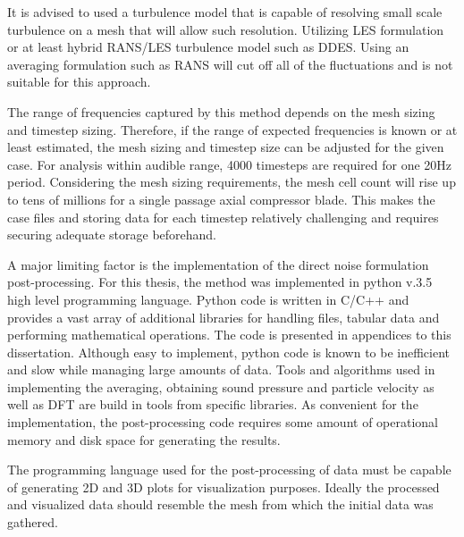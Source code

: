 It is advised to used a turbulence model that is capable of resolving small scale turbulence on a mesh that will allow such resolution. Utilizing LES formulation or at least hybrid RANS/LES turbulence model such as DDES. Using an averaging formulation such as RANS will cut off all of the fluctuations and is not suitable for this approach.


The range of frequencies captured by this method depends on the mesh sizing and timestep sizing. Therefore, if the range of expected frequencies is known or at least estimated, the mesh sizing and timestep size can be adjusted for the given case. For analysis within audible range, 4000 timesteps are required for one 20Hz period. Considering the mesh sizing requirements, the mesh cell count will rise up to tens of millions for a single passage axial compressor blade. This makes the case files and storing data for each timestep relatively challenging and requires securing adequate storage beforehand.
 
A major limiting factor is the implementation of the direct noise formulation post-processing. For this thesis, the method was implemented in python v.3.5 high level programming language. Python code is written in C/C++ and provides a vast array of additional libraries for handling files, tabular data and performing mathematical operations. The code is presented in appendices to this dissertation. Although easy to implement, python code is known to be inefficient and slow while managing large amounts of data. Tools and algorithms used in implementing the averaging, obtaining sound pressure and particle velocity as well as DFT are build in tools from specific libraries. As convenient for the implementation, the post-processing code requires some amount of operational memory and disk space for generating the results.

The programming language used for the post-processing of data must be capable of generating 2D and 3D plots for visualization purposes. Ideally the processed and visualized data should resemble the mesh from which the initial data was gathered.
